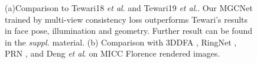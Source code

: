 \documentclass[runningheads]{llncs}
\newcommand{\etal}{\textit{et al}.}
\begin{document}
\begin{figure}[htbp]
	\centering  
	\caption{(a)Comparison to Tewari18 \etal \cite{unsuper_tewari2018self} and Tewari19 \etal \cite{unsuper_mul_tewari2019fml}. Our MGCNet trained by multi-view consistency loss outperforms Tewari's results in face pose, illumination and geometry. Further result can be found in the \textit{suppl.} material. (b) Comparison with 3DDFA \cite{dataset_aflw20003D_300WLP_zhu2016face}, RingNet \cite{unsuper_mul_sanyal2019learning_ring}, PRN \cite{super_fit_volu_exp_feng2018joint}, and Deng \etal \cite{unsuper_mul_ng2019accurate} on MICC Florence rendered images. 
}
\end{figure}
\end{document}
